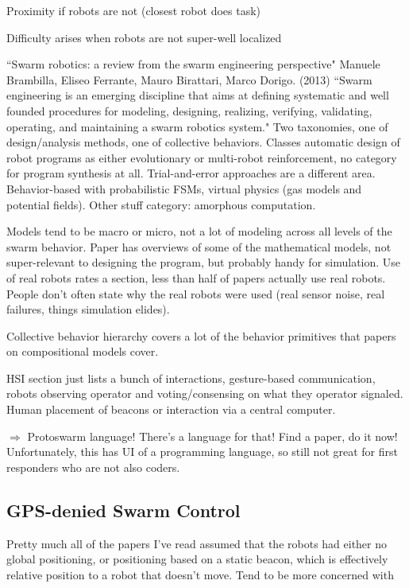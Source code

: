 \documentclass[]{article}
\begin{document}
Proximity if robots are not (closest robot does task)

Difficulty arises when robots are not super-well localized

``Swarm robotics: a review from the swarm engineering perspective" \cite{brambilla2013swarm} Manuele Brambilla, Eliseo Ferrante, Mauro Birattari, Marco Dorigo. (2013) ``Swarm engineering is an emerging discipline that aims at defining systematic and well founded procedures for modeling, designing, realizing, verifying, validating, operating, and maintaining a swarm robotics system." Two taxonomies, one of design/analysis methods, one of collective behaviors. Classes automatic design of robot programs as either evolutionary or multi-robot reinforcement, no category for program synthesis at all. Trial-and-error approaches are a different area. Behavior-based with probabilistic FSMs, virtual physics (gas models and potential fields). Other stuff category: amorphous computation. 

Models tend to be macro or micro, not a lot of modeling across all levels of the swarm behavior. Paper has overviews of some of the mathematical models, not super-relevant to designing the program, but probably handy for simulation. Use of real robots rates a section, less than half of papers actually use real robots. People don't often state why the real robots were used (real sensor noise, real failures, things simulation elides). 

Collective behavior hierarchy covers a lot of the behavior primitives that papers on compositional models cover. 

HSI section just lists a bunch of interactions, gesture-based communication, robots observing operator and voting/consensing on what they operator signaled. Human placement of beacons or interaction via a central computer. 

$\Rightarrow$ Protoswarm language! There's a language for that! Find a paper, do it now! Unfortunately, this has UI of a programming language, so still not great for first responders who are not also coders. 


\subsection{GPS-denied Swarm Control}

Pretty much all of the papers I've read assumed that the robots had either no global positioning, or positioning based on a static beacon, which is effectively relative position to a robot that doesn't move. Tend to be more concerned with 
\end{document}
